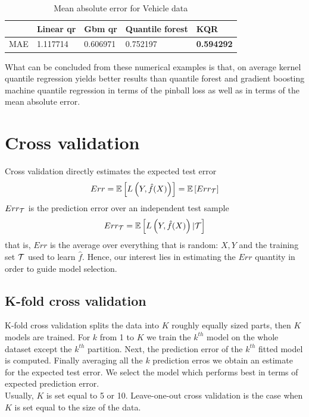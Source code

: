 \begin{table}
    \caption{Mean absolute error for Vehicle data}
    \begin{tabular}{lllll}
    \toprule
     & Linear qr & Gbm qr & Quantile forest & KQR \\
    \midrule
   MAE  & 1.117714 & 0.606971 & 0.752197 & \textbf{0.594292} \\
    \bottomrule
    \end{tabular}
\end{table}
What can be concluded from these numerical examples is that, on average kernel quantile regression yields better results than quantile forest \cite{meinshausen2006quantile} and gradient boosting machine quantile regression \cite {friedman2001greedy} in terms of the pinball loss as well as in terms of the mean absolute error.



\section{Cross validation}\label{appendix:cross_validation}
Cross validation directly estimates the expected test error
\begin{equation}
    Err=\mathbb{E}\left[L\left(Y,\hat{f}(X)\right)\right]=\mathbb{E}\left[Err_{\mathcal{T}}\right]
\end{equation}
$Err_{\mathcal{T}}$ is the prediction error over an independent test sample
\begin{equation}
    Err_{\mathcal{T}}=\mathbb{E}\left[L\left(Y,\hat{f}(X)\right)| \mathcal{T} \right]
\end{equation}
that is, $Err$ is the average over everything that is random: $X,Y$ and the training set $\mathcal{T}$ used to learn $\hat{f}$. Hence, our interest lies in estimating the $Err$ quantity in order to guide model selection.
\subsection{K-fold cross validation}
K-fold cross validation splits the data into $K$ roughly equally sized parts, then $K$ models are trained. For $k$ from 1 to $K$ we train the $k^{th}$ model on the whole dataset except the $k^{th}$ partition. Next,  the prediction error of the $k^{th}$ fitted model is computed. Finally averaging all the $k$ prediction erros we obtain an estimate for the expected test error. We select the model which performs best in terms of expected prediction error.
\\
Usually, $K$ is set equal to 5 or 10. Leave-one-out cross validation is the case when $K$ is set equal to the size of the data.
